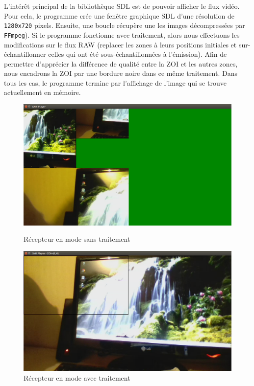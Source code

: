 \documentclass[11pt,a4paper]{article}
\begin{document}
\bigbreak
L'intérêt principal de la bibliothèque SDL est de pouvoir afficher le flux vidéo.
Pour cela, le programme crée une fenêtre graphique SDL d'une résolution de \texttt{1280x720} pixels.
Ensuite, une boucle récupère une les images décompressées par \texttt{FFmpeg}).
Si le programme fonctionne avec traitement, alors nous effectuons les modifications sur le flux RAW (replacer les zones à leurs positions initiales et sur-échantillonner celles qui ont été sous-échantillonnées à l'émission). 
Afin de permettre d'apprécier la différence de qualité entre la ZOI et les autres zones, nous encadrons la ZOI par une bordure noire dans ce même traitement.
Dans tous les cas, le programme termine par l'affichage de l'image qui se trouve actuellement en mémoire.

\begin{figure}[H]
  \includegraphics[width=\linewidth]{images/recepteur_sans_traitement.png}
  \caption{Récepteur en mode sans traitement}
\endminipage\hfill
{}
  \includegraphics[width=\linewidth]{images/recepteur_avec_traitement.png}
  \caption{Récepteur en mode avec traitement}
\endminipage
\end{figure}
\end{document}
